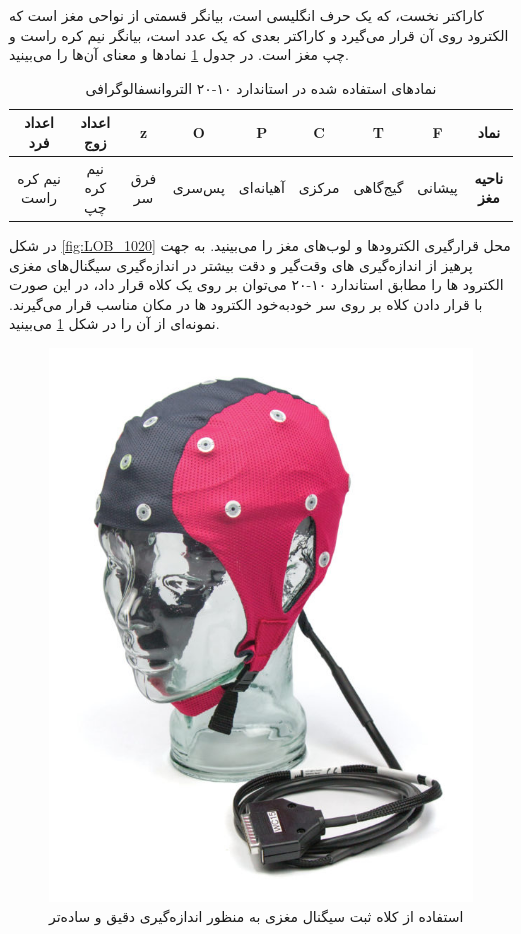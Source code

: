 کاراکتر نخست، که یک حرف انگلیسی است، بیانگر قسمتی از نواحی مغز است که الکترود روی آن قرار می‌گیرد و کاراکتر بعدی که یک عدد است، بیانگر نیم کره راست و چپ مغز است. در جدول
\ref{tab:EEG_CHAR}
نمادها و معنای آن‌ها را می‌بینید.
\begin{center}
	\begin{table}[h]
	\centering
	\caption{نمادهای استفاده شده در استاندارد ۱۰-۲۰ التروانسفالوگرافی}
	\label{tab:EEG_CHAR}
	\begin{tabular}{|c|c|c|c|c|c|c|c|c|}
		\hline
		اعداد فرد    & اعداد زوج  & z      & O      & P         & C     & T        & F      &\textbf{ نماد}      \\ \hline
		نیم کره راست & نیم کره چپ & فرق سر & پس‌سری & آهیانه‌ای & مرکزی & گیج‌گاهی & پیشانی & \textbf{ناحیه مغز} \\ \hline
	\end{tabular}
\end{table}
\end{center}
در شکل
\ref{fig:LOB_1020}
محل قرارگیری الکترودها و لو‌ب‌های مغز را می‌بینید.
به جهت پرهیز از اندازه‌گیری های وقت‌گیر و دقت بیشتر در اندازه‌گیری سیگنال‌های مغزی الکترود ها را مطابق استاندارد ۱۰-۲۰ می‌توان بر روی یک کلاه  قرار داد، در این صورت با قرار دادن کلاه بر روی سر خودبه‌خود الکترود ها در مکان مناسب قرار می‌گیرند. نمونه‌ای از آن را در شکل 
\ref{fig:eegcap}
می‌بینید.
\begin{figure}[htbp]
	\centering
	\includegraphics[width=0.3\linewidth]{figures/EEG_cap}
	\caption[کلاه ثبت سیگنال مغزی]{استفاده از کلاه ثبت سیگنال مغزی به منظور اندازه‌گیری دقیق و ساده‌تر}
	\label{fig:eegcap}
\end{figure}

